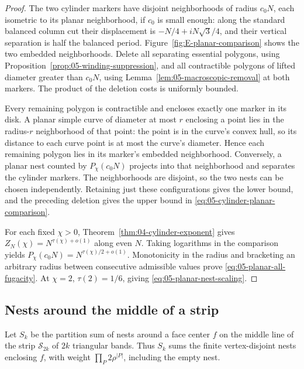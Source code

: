 \begin{proof}
The two cylinder markers have disjoint neighborhoods of radius
\(c_0N\), each isometric to its planar neighborhood, if \(c_0\) is
small enough: along the standard balanced column cut their displacement
is \(-N/4+iN\sqrt3/4\), and their vertical separation is half the
balanced period.
Figure~\ref{fig:E-planar-comparison} shows the two embedded neighborhoods.
Delete all separating essential polygons, using
Proposition~\ref{prop:05-winding-suppression}, and all contractible
polygons of lifted diameter greater than \(c_0N\), using
Lemma~\ref{lem:05-macroscopic-removal} at both markers. The product of
the deletion costs is uniformly bounded.

Every remaining polygon is contractible and encloses exactly one marker
in its disk. A planar simple curve of diameter at most \(r\) enclosing a
point lies in the radius-\(r\) neighborhood of that point: the point is
in the curve's convex hull, so its distance to each curve point is at
most the curve's diameter. Hence each remaining polygon lies in its
marker's embedded neighborhood. Conversely, a planar nest counted by
\(P_\chi(c_0N)\) projects into that neighborhood and separates the
cylinder markers. The neighborhoods are disjoint, so the two nests can
be chosen independently. Retaining just these configurations gives the
lower bound, and the preceding deletion gives the upper bound in
\eqref{eq:05-cylinder-planar-comparison}.

For each fixed \(\chi>0\), Theorem~\ref{thm:04-cylinder-exponent} gives
\(Z_N(\chi)=N^{\tau(\chi)+o(1)}\) along even \(N\). Taking logarithms
in the comparison yields
\(P_\chi(c_0N)=N^{\tau(\chi)/2+o(1)}\). Monotonicity in the radius and
bracketing an arbitrary radius between consecutive admissible values
prove \eqref{eq:05-planar-all-fugacity}. At \(\chi=2\),
\(\tau(2)=1/6\), giving \eqref{eq:05-planar-nest-scaling}.
\end{proof}

\subsection{Nests around the middle of a strip}

Let \(S_k\) be the partition sum of nests around a face center \(f\)
on the middle line of the strip \(\mathcal S_{2k}\) of \(2k\) triangular
bands. Thus \(S_k\) sums the finite vertex-disjoint nests enclosing \(f\),
with weight \(\prod_P2\rho^{|P|}\), including the empty nest.

